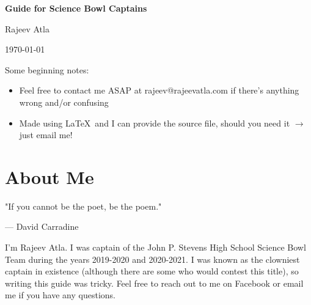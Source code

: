 \documentclass[11pt, letterpaper]{article}
\begin{document}
\setlength{\parindent}{0.5in}

\titleformat{\section}{\normalfont\Large\bfseries}{\color{red}\S \thesection}{0.5em}{}
\titleformat{\subsection}{\normalfont\Large\bfseries}{\color{olive}\S \thesubsection}{0.5em}{}
\titleformat{\subsubsection}{\normalfont\Large\bfseries}{\color{blue}\S \thesubsubsection}{0.5em}{}


\begin{center}
    \Large \textbf{Guide for Science Bowl Captains}
\end{center}
\begin{center}
    \Large Rajeev Atla
\end{center}
\begin{center}
    \Large \today
\end{center}

\noindent Some beginning notes:
\begin{itemize}
    \item Feel free to contact me ASAP at rajeev@rajeevatla.com if there's anything wrong and/or confusing
    \item Made using \LaTeX\ and I can provide the source file, should you need it $\to$ just email me!
\end{itemize}

\newpage

\tableofcontents

\newpage

\section{About Me}



\epigraph{"If you cannot be the poet, be the poem."}{--- \textup{David Carradine}}


I'm Rajeev Atla.
I was captain of the John P. Stevens High School Science Bowl Team during the years 2019-2020 and 2020-2021.
I was known as the clowniest captain in existence (although there are some who would contest this title), so writing this guide was tricky.
Feel free to reach out to me on Facebook or email me if you have any questions.
\end{document}
